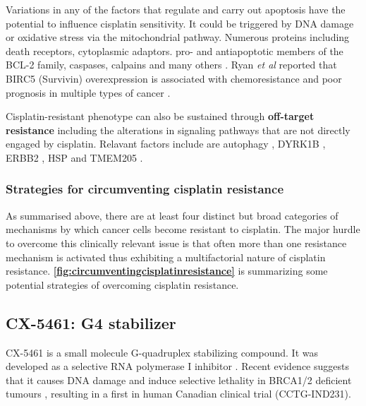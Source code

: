 Variations in any of the factors that regulate and carry out apoptosis have the potential to influence cisplatin sensitivity. It could be triggered by DNA damage or oxidative stress via the mitochondrial pathway. Numerous proteins including death receptors, cytoplasmic adaptors. pro- and antiapoptotic members of the BCL-2 family, caspases, calpains and many others \cite{jain2011molecular, janson2010resistance, michaud2009bcl}. Ryan \textit{et al} reported that BIRC5 (Survivin) overexpression is associated with chemoresistance and poor prognosis in multiple types of cancer \cite{ryan2009survivin}. 

Cisplatin-resistant phenotype can also be sustained through \textbf{off-target resistance} including the alterations in signaling pathways that are not directly engaged by cisplatin. Relavant factors include are autophagy \cite{tan2019trp14}, DYRK1B \cite{hu2010depleting}, ERBB2 \cite{fijolek2006p53}, HSP \cite{ren2008down} and TMEM205 \cite{shen2010elevated}.


\subsubsection{Strategies for circumventing cisplatin resistance}
As summarised above, there are at least four distinct but broad categories of mechanisms by which cancer cells become resistant to cisplatin. The major hurdle to overcome this clinically relevant issue is that often more than one resistance mechanism is activated thus exhibiting a multifactorial nature of cisplatin resistance.  \textbf{\autoref{fig:circumventingcisplatinresistance}} is summarizing some potential strategies of overcoming cisplatin resistance. 


\subsection{CX-5461: G4 stabilizer} 
CX-5461 is a small molecule G-quadruplex stabilizing compound. It was developed as a selective RNA polymerase I inhibitor \cite{drygin2011targeting}. Recent evidence suggests that it causes DNA damage and induce selective lethality in BRCA1/2 deficient tumours \cite{xu2017cx}, resulting in a first in human Canadian clinical trial (CCTG-IND231). 
 

